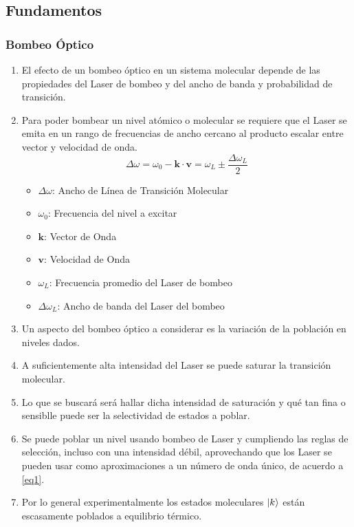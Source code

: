 \documentclass[aps,rmp,reprint,longbibliography]{revtex4-1}
\begin{document}
\subsection{Fundamentos}
\subsubsection{Bombeo Óptico}
\begin{enumerate}
\item El efecto de un bombeo óptico en un sistema molecular depende de las propiedades del Laser de bombeo y del ancho de banda y probabilidad de transición. 
\item Para poder bombear un nivel atómico o molecular se requiere que el Laser se emita en un rango de frecuencias de ancho cercano al producto escalar entre vector y velocidad de onda.
\begin{equation}\label{eq1}\Delta\omega=\omega_0-\textbf{k}\cdot\textbf{v}=\omega_L\pm\frac{\Delta \omega_L}{2}\end{equation}
\begin{itemize}
    \item $\Delta\omega$: Ancho de Línea de Transición Molecular
    \item $\omega_0$: Frecuencia del nivel a excitar
    \item $\textbf{k}$: Vector de Onda 
    \item $\textbf{v}$: Velocidad de Onda
    \item $\omega_L$: Frecuencia promedio del Laser de bombeo
    \item $\Delta\omega_L$: Ancho de banda del Laser del bombeo
\end{itemize}
\item Un aspecto del bombeo óptico a considerar es la variación de la población en niveles dados. 
\item A suficientemente alta intensidad del Laser se puede saturar la transición molecular.
\item Lo que se buscará será hallar dicha intensidad de saturación y qué tan fina o sensiblle puede ser la selectividad de estados a poblar.
\item Se puede poblar un nivel usando bombeo de Laser y cumpliendo las reglas de selección, incluso con una intensidad débil, aprovechando que los Laser se pueden usar como aproximaciones a un número de onda único, de acuerdo a \ref{eq1}.
\item Por lo general experimentalmente los estados moleculares $\ket{k}$ están escasamente poblados a equilibrio térmico. 

\end{enumerate}
\end{document}
